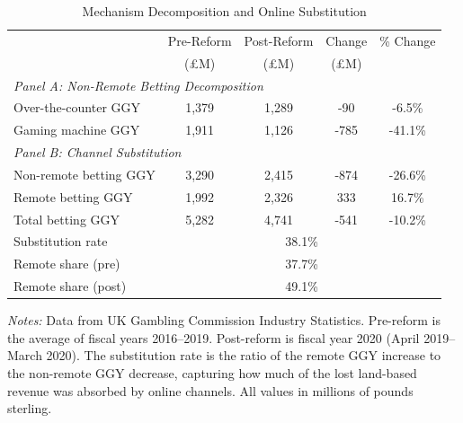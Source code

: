 \begin{table}[H]
\centering
\caption{Mechanism Decomposition and Online Substitution}
\begin{threeparttable}
\begin{tabular}{lcccc}
\toprule
 & Pre-Reform & Post-Reform & Change & \% Change \\
 & (\pounds M) & (\pounds M) & (\pounds M) & \\
\midrule
\multicolumn{5}{l}{\textit{Panel A: Non-Remote Betting Decomposition}} \\
\quad Over-the-counter GGY & 1,379 & 1,289 & -90 & -6.5\% \\
\quad Gaming machine GGY & 1,911 & 1,126 & -785 & -41.1\% \\
\midrule
\multicolumn{5}{l}{\textit{Panel B: Channel Substitution}} \\
\quad Non-remote betting GGY & 3,290 & 2,415 & -874 & -26.6\% \\
\quad Remote betting GGY & 1,992 & 2,326 & 333 & 16.7\% \\
\quad Total betting GGY & 5,282 & 4,741 & -541 & -10.2\% \\
\midrule
\quad Substitution rate & \multicolumn{4}{c}{38.1\%} \\
\quad Remote share (pre) & \multicolumn{4}{c}{37.7\%} \\
\quad Remote share (post) & \multicolumn{4}{c}{49.1\%} \\
\bottomrule
\end{tabular}
\begin{tablenotes}[flushleft]
\small
\item \textit{Notes:} Data from UK Gambling Commission Industry Statistics. Pre-reform is the average of fiscal years 2016--2019. Post-reform is fiscal year 2020 (April 2019--March 2020). The substitution rate is the ratio of the remote GGY increase to the non-remote GGY decrease, capturing how much of the lost land-based revenue was absorbed by online channels. All values in millions of pounds sterling.
\end{tablenotes}
\end{threeparttable}
\label{tab:mechanism}
\end{table}

